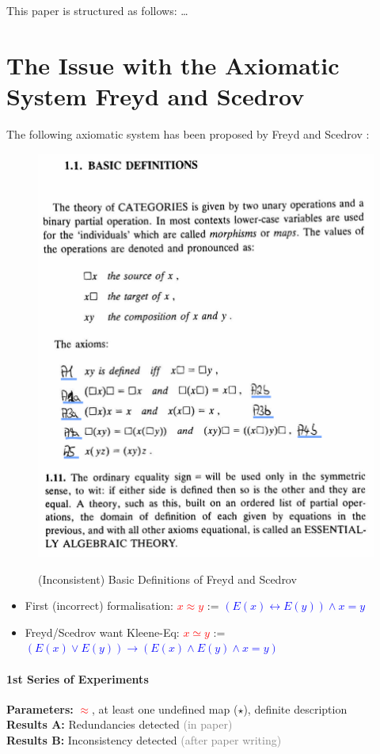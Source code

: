 \documentclass{article}
\begin{document}
This paper is structured as follows: \ldots

\section{The Issue with the Axiomatic System Freyd and Scedrov}
The following axiomatic system has been proposed by Freyd and Scedrov \cite{ICMS16}:

\begin{figure} \centering
\colorbox{black!20}{
\includegraphics[width=.6\textwidth]{./Images/FreydScedrov2.png}
}
\caption{(Inconsistent) Basic Definitions of Freyd and Scedrov}
\end{figure}


\begin{itemize}
\item First (incorrect) formalisation: \quad \quad \textcolor{red}{$x \approx y$} \quad := \quad
  \textcolor{blue}{$(E(x) \longleftrightarrow E(y)) \wedge x = y$}
\item Freyd/Scedrov want Kleene-Eq: \quad\textcolor{red}{$x \simeq y$} \quad := \quad  \textcolor{blue}{$(E(x) \vee E(y)) \longrightarrow (E(x) \wedge E(y) \wedge x = y)$}
\end{itemize}

\paragraph{1st Series of Experiments}
\textbf{Parameters:} \textcolor{red}{$\approx$}, at least one undefined map ($\star$), definite
description \\
\textbf{Results A:} Redundancies detected \hfill \textcolor{gray}{(in paper)} \\
\textbf{Results B:} Inconsistency detected \hfill \textcolor{gray}{(after paper writing)}
\end{document}
